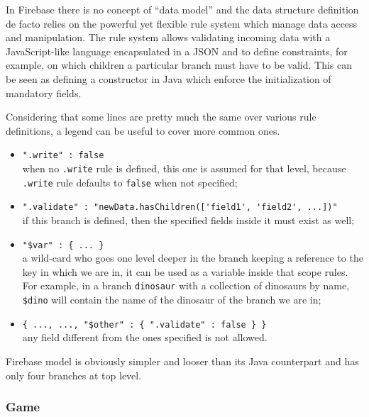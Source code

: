 			In Firebase there is no concept of “data model” and the data structure definition de facto relies on the powerful yet flexible rule system which manage data access and manipulation.
			The rule system allows validating incoming data with a JavaScript-like language encapsulated in a JSON and to define constraints, for example, on which children a particular branch must have to be valid. This can be seen as defining a constructor in Java which enforce the initialization of mandatory fields.
			
			Considering that some lines are pretty much the same over various rule definitions, a legend can be useful to cover more common ones.
			
			\begin{itemize}
				\item \lstinline|".write" : false| \\ when no \lstinline|.write| rule is defined, this one is assumed for that level, because \lstinline|.write| rule defaults to \lstinline|false| when not specified;
				\item \lstinline|".validate" : "newData.hasChildren(['field1', 'field2', ...])"| \\ if this branch is defined, then the specified fields inside it must exist as well;
				\item \lstinline|"$var" : { ... }| \\ a wild-card who goes one level deeper in the branch keeping a reference to the key in which we are in, it can be used as a variable inside that scope rules. For example, in a branch \lstinline|dinosaur| with a collection of dinosaurs by name, \lstinline|$dino| will contain the name of the dinosaur of the branch we are in;
				\item \lstinline|{ ..., ..., "$other" : { ".validate" : false } }| \\ any field different from the ones specified is not allowed.
			\end{itemize}
			
			Firebase model is obviously simpler and looser than its Java counterpart and has only four branches at top level.
			
			
			\subsubsection{Game}
			
				
				
